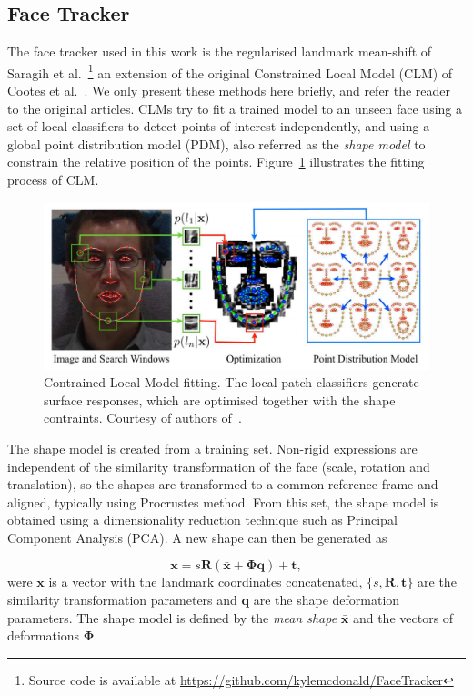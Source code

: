 \documentclass[]{article}
\begin{document}
\subsection{Face Tracker}
The face tracker used in this work is the regularised landmark mean-shift of Saragih et
al.~\cite{saragih2011deformable}\footnote{Source code is available at
  \url{https://github.com/kylemcdonald/FaceTracker}} an extension of
the original Constrained Local Model (CLM) of Cootes et al.~\cite{cristinacce2006feature}. We only present these methods
here briefly, and refer the reader to the original articles. CLMs try to fit a trained model to an unseen face using a
set of local classifiers to detect points of interest independently, and using a global point distribution model (PDM),
also referred as the \textit{shape model} to constrain the relative position of the points. Figure~\ref{fig:CLM} illustrates the fitting process of CLM.

\begin{figure}[htbp]
  \centering
  \includegraphics[width=12cm]{figures/CLM.png}
  \caption{Contrained Local Model fitting. The local patch classifiers generate surface responses, which are optimised
 together with the shape contraints. Courtesy of authors of~\cite{saragih2011deformable}.}
  \label{fig:CLM}
\end{figure}


The shape model is created from a training set. Non-rigid expressions are independent of the similarity transformation
of the face (scale, rotation and translation), so the shapes are transformed to a common reference frame and aligned,
typically using Procrustes method. From this set, the shape model is obtained using a dimensionality reduction technique
such as Principal Component Analysis (PCA). A new shape can then be generated as

\begin{equation}
  \label{eq:shape_model}
  \mathbf{x} = s\mathbf{R}(\bar{\mathbf{x}} +
  \boldsymbol{\Phi}\mathbf{q}) + \mathbf{t},
\end{equation}
were $\mathbf{x}$ is a vector with the landmark coordinates concatenated, 
$\{s,\mathbf{R},\mathbf{t}\}$ are the similarity transformation
parameters and $\mathbf{q}$ are the shape deformation parameters. The
shape model is defined by the \textit{mean shape} $\mathbf{\bar{x}}$
and the vectors of deformations $\boldsymbol{\Phi}$.
\end{document}
